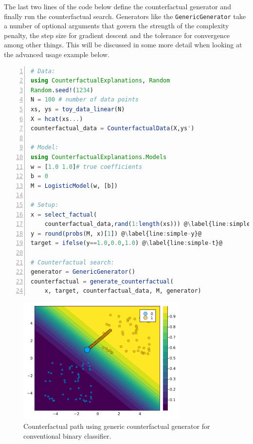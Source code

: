 \documentclass[
  letterpaper,
  DIV=11,
  numbers=noendperiod]{scrartcl}
\begin{document}
The last two lines of the code below define the counterfactual generator
and finally run the counterfactual search. Generators like the
\texttt{GenericGenerator} take a number of optional arguments that
govern the strength of the complexity penalty, the step size for
gradient descent and the tolerance for convergence among other things.
This will be discussed in some more detail when looking at the advanced
usage example below.

\begin{lstlisting}[language=Julia, escapechar=@, numbers=left, label={lst:simple}, caption={}] 
# Data:
using CounterfactualExplanations, Random
Random.seed!(1234)
N = 100 # number of data points
xs, ys = toy_data_linear(N)
X = hcat(xs...)
counterfactual_data = CounterfactualData(X,ys')

# Model:
using CounterfactualExplanations.Models 
w = [1.0 1.0]# true coefficients
b = 0
M = LogisticModel(w, [b])

# Setup:
x = select_factual(
    counterfactual_data,rand(1:length(xs))) @\label{line:simple-x}@
y = round(probs(M, x)[1]) @\label{line:simple-y}@
target = ifelse(y==1.0,0.0,1.0) @\label{line:simple-t}@

# Counterfactual search:
generator = GenericGenerator()
counterfactual = generate_counterfactual(
    x, target, counterfactual_data, M, generator)
\end{lstlisting}

\begin{figure}

{\centering \includegraphics[width=3.33333in,height=2.5in]{www/ce_binary.png}

}

\caption{\label{fig-binary}Counterfactual path using generic
counterfactual generator for conventional binary classifier.}

\end{figure}
\end{document}
